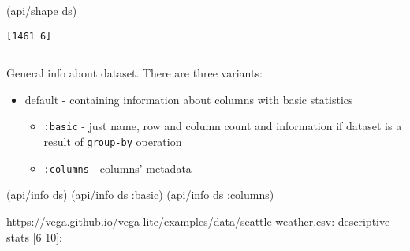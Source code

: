 \documentclass[]{article}
\newenvironment{Shaded}{\begin{snugshade}}{\end{snugshade}}
\newcommand{\AttributeTok}[1]{\textcolor[rgb]{0.77,0.63,0.00}{#1}}
\newcommand{\NormalTok}[1]{#1}
\providecommand{\tightlist}{%
  \setlength{\itemsep}{0pt}\setlength{\parskip}{0pt}}
\begin{document}
\begin{Shaded}
\begin{Highlighting}[]
\NormalTok{(api/shape ds)}
\end{Highlighting}
\end{Shaded}

\begin{verbatim}
[1461 6]
\end{verbatim}

\begin{center}\rule{0.5\linewidth}{0.5pt}\end{center}

General info about dataset. There are three variants:

\begin{itemize}
\tightlist
\item
  default - containing information about columns with basic statistics

  \begin{itemize}
  \tightlist
  \item
    \texttt{:basic} - just name, row and column count and information if
    dataset is a result of \texttt{group-by} operation
  \item
    \texttt{:columns} - columns' metadata
  \end{itemize}
\end{itemize}

\begin{Shaded}
\begin{Highlighting}[]
\NormalTok{(api/info ds)}
\NormalTok{(api/info ds }\AttributeTok{:basic}\NormalTok{)}
\NormalTok{(api/info ds }\AttributeTok{:columns}\NormalTok{)}
\end{Highlighting}
\end{Shaded}

\url{https://vega.github.io/vega-lite/examples/data/seattle-weather.csv}:
descriptive-stats {[}6 10{]}:
\end{document}
